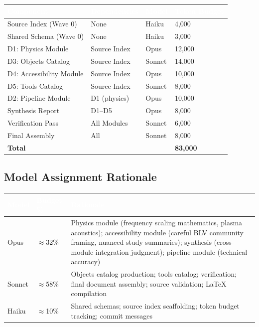 \documentclass[11pt,letterpaper]{article}
\newcommand{\tableheader}[1]{\textbf{\sffamily\textcolor{white}{#1}}}
\begin{document}
\begin{center}
\begin{tabularx}{\textwidth}{L{3cm}L{3cm}C{2cm}C{2.5cm}}
\toprule
{}
\tableheader{Component} & \tableheader{Dependencies} & \tableheader{Model} & \tableheader{Token Budget} \\
\midrule
Source Index (Wave 0) & None & Haiku & 4,000 \\
Shared Schema (Wave 0) & None & Haiku & 3,000 \\
D1: Physics Module & Source Index & Opus & 12,000 \\
D3: Objects Catalog & Source Index & Sonnet & 14,000 \\
D4: Accessibility Module & Source Index & Opus & 10,000 \\
D5: Tools Catalog & Source Index & Sonnet & 8,000 \\
D2: Pipeline Module & D1 (physics) & Opus & 10,000 \\
Synthesis Report & D1--D5 & Opus & 8,000 \\
Verification Pass & All Modules & Sonnet & 6,000 \\
Final Assembly & All & Sonnet & 8,000 \\
\midrule
{}
\textbf{Total} & & & \textbf{83,000} \\
\bottomrule
\end{tabularx}
\end{center}

\subsection{Model Assignment Rationale}

\begin{center}
\begin{tabularx}{\textwidth}{L{2cm}C{1.8cm}X}
\toprule
{}
\tableheader{Model} & \tableheader{Budget \%} & \tableheader{Rationale} \\
\midrule
Opus & $\approx$32\% & Physics module (frequency scaling mathematics, plasma acoustics); accessibility module (careful BLV community framing, nuanced study summaries); synthesis (cross-module integration judgment); pipeline module (technical accuracy) \\
Sonnet & $\approx$58\% & Objects catalog production; tools catalog; verification; final document assembly; source validation; LaTeX compilation \\
Haiku & $\approx$10\% & Shared schemas; source index scaffolding; token budget tracking; commit messages \\
\bottomrule
\end{tabularx}
\end{center}
\end{document}
